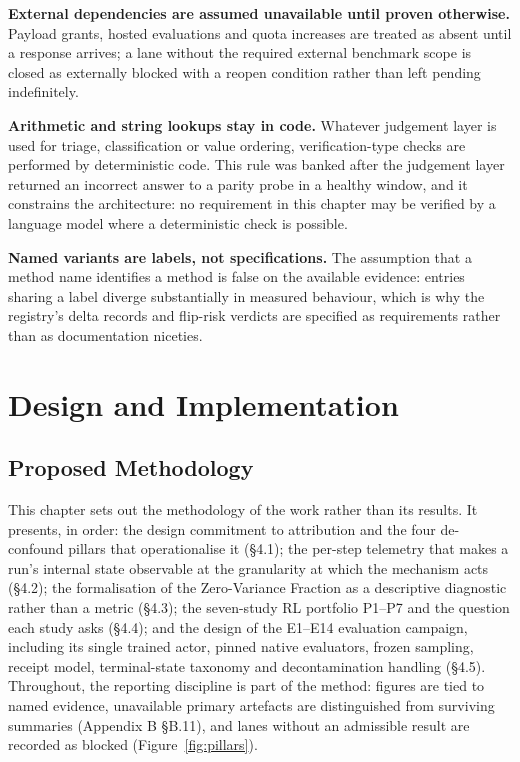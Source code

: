 \documentclass[12pt,a4paper]{report}
\begin{document}
\textbf{External dependencies are assumed unavailable until proven
otherwise.} Payload grants, hosted evaluations and quota increases are
treated as absent until a response arrives; a lane without the required
external benchmark scope is closed as externally blocked with a reopen
condition rather than left pending indefinitely.

\textbf{Arithmetic and string lookups stay in code.} Whatever judgement
layer is used for triage, classification or value ordering,
verification-type checks are performed by deterministic code. This rule
was banked after the judgement layer returned an incorrect answer to a
parity probe in a healthy window, and it constrains the architecture: no
requirement in this chapter may be verified by a language model where a
deterministic check is possible.

\textbf{Named variants are labels, not specifications.} The assumption
that a method name identifies a method is false on the available
evidence: entries sharing a label diverge substantially in measured
behaviour, which is why the registry's delta records and flip-risk
verdicts are specified as requirements rather than as documentation
niceties.



\part{Design and Implementation}


\chapter{Proposed Methodology}\label{proposed-methodology}

This chapter sets out the methodology of the work rather than its
results. It presents, in order: the design commitment to attribution and
the four de-confound pillars that operationalise it (§4.1); the per-step
telemetry that makes a run's internal state observable at the
granularity at which the mechanism acts (§4.2); the formalisation of the
Zero-Variance Fraction as a descriptive diagnostic rather than a metric
(§4.3); the seven-study RL portfolio P1--P7 and the question each study
asks (§4.4); and the design of the E1--E14 evaluation campaign,
including its single trained actor, pinned native evaluators, frozen
sampling, receipt model, terminal-state taxonomy and decontamination
handling (§4.5). Throughout, the reporting discipline is part of the
method: figures are tied to named evidence, unavailable primary
artefacts are distinguished from surviving summaries (Appendix B §B.11),
and lanes without an admissible result are recorded as blocked (Figure~\ref{fig:pillars}).
\end{document}
